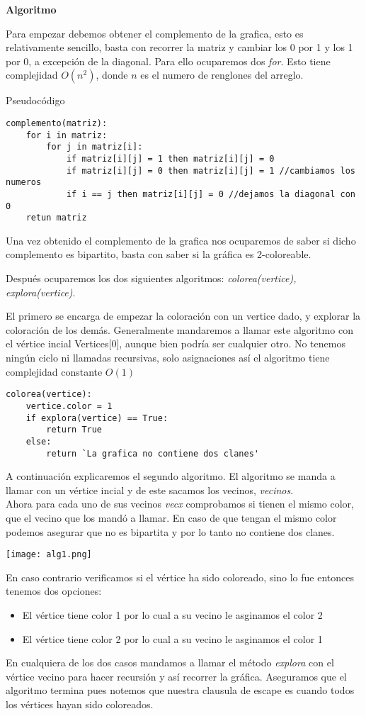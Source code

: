 \documentclass[12pt,letterpaper]{article}
\begin{document}
\textbf{Algoritmo}

Para empezar debemos obtener el complemento de la grafica, esto es relativamente sencillo, basta con recorrer la matriz y cambiar los 0 por 1 y los 1 por 0, a excepción de la diagonal. Para ello ocuparemos dos \textit{for}. Esto tiene complejidad $O(n^2)$, donde $n$ es el numero de renglones del arreglo.

Pseudocódigo
\begin{verbatim}
complemento(matriz):
    for i in matriz:
        for j in matriz[i]:
            if matriz[i][j] = 1 then matriz[i][j] = 0
            if matriz[i][j] = 0 then matriz[i][j] = 1 //cambiamos los numeros
            if i == j then matriz[i][j] = 0 //dejamos la diagonal con 0
    retun matriz
\end{verbatim}

Una vez obtenido el complemento de la grafica nos ocuparemos de saber si dicho complemento es bipartito, basta con saber si la gráfica es 2-coloreable.

Después ocuparemos los dos siguientes algoritmos: \textit{colorea(vertice), explora(vertice)}.

El primero se encarga de empezar la coloración con un vertice dado, y explorar la coloración de los demás. Generalmente mandaremos a llamar este algoritmo con el vértice incial Vertices[0], aunque bien podría ser cualquier otro. No tenemos ningún ciclo ni llamadas recursivas, solo asignaciones así el algoritmo tiene complejidad constante $O(1)$

\begin{verbatim}
colorea(vertice):
    vertice.color = 1
    if explora(vertice) == True:
        return True
    else:
        return `La grafica no contiene dos clanes'
\end{verbatim}
A continuación explicaremos el segundo algoritmo. El algoritmo se manda a llamar con un vértice incial y de este sacamos los vecinos, \textit{vecinos}.\\
Ahora para cada uno de sus vecinos \textit{vecx} comprobamos si tienen el mismo color, que el vecino que los mandó a llamar. En caso de que tengan el mismo color podemos asegurar que no es bipartita y por lo tanto no contiene dos clanes.
\begin{center}
    \texttt{[image: alg1.png]}
\end{center}
En caso contrario verificamos si el vértice ha sido coloreado, sino lo fue entonces tenemos dos opciones:
\begin{itemize}
    \item El vértice tiene color 1 por lo cual a su vecino le asginamos el color 2
    
    \item El vértice tiene color 2 por lo cual a su vecino le asginamos el color 1
\end{itemize}
En cualquiera de los dos casos mandamos a llamar el método \textit{explora} con el vértice vecino para hacer recursión y así recorrer la gráfica. Aseguramos que el algoritmo termina pues notemos que nuestra clausula de escape es cuando todos los vértices hayan sido coloreados.
\end{document}
